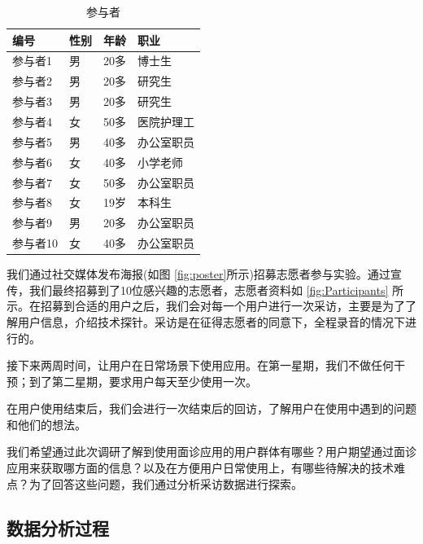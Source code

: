 \begin{table}
    \centering
    \begin{tabular}{llll}
          \toprule
          编号 &	性别 &	年龄 &	职业 \\
          \midrule
          参与者1 &	男 &	20多 &	博士生 \\
          参与者2 &	男 &	20多 &	研究生 \\
          参与者3 &	男 &	20多 &	研究生 \\
          参与者4 &	女 &	50多 &	医院护理工 \\
          参与者5 &	男 &	40多 &	办公室职员 \\
          参与者6 &	女 &	40多 &	小学老师 \\
          参与者7 &	女 &	50多 &	办公室职员 \\
          参与者8 &	女 &	19岁 &	本科生 \\
          参与者9 &	男 &	20多 &	办公室职员 \\
          参与者10 &	女 &	40多 &	办公室职员 \\
          \bottomrule
    \end{tabular}
    \label{tab:Participants}
    \caption{参与者}
  \end{table}
  我们通过社交媒体发布海报(如图 \ref{fig:poster}所示)招募志愿者参与实验。通过宣传，我们最终招募到了10位感兴趣的志愿者，志愿者资料如 \ref{fig:Participants} 所示。在招募到合适的用户之后，我们会对每一个用户进行一次采访，主要是为了了解用户信息，介绍技术探针。采访是在征得志愿者的同意下，全程录音的情况下进行的。


接下来两周时间，让用户在日常场景下使用应用。在第一星期，我们不做任何干预；到了第二星期，要求用户每天至少使用一次。

在用户使用结束后，我们会进行一次结束后的回访，了解用户在使用中遇到的问题和他们的想法。

我们希望通过此次调研了解到使用面诊应用的用户群体有哪些？用户期望通过面诊应用来获取哪方面的信息？以及在方便用户日常使用上，有哪些待解决的技术难点？为了回答这些问题，我们通过分析采访数据进行探索。

\subsection{数据分析过程}

